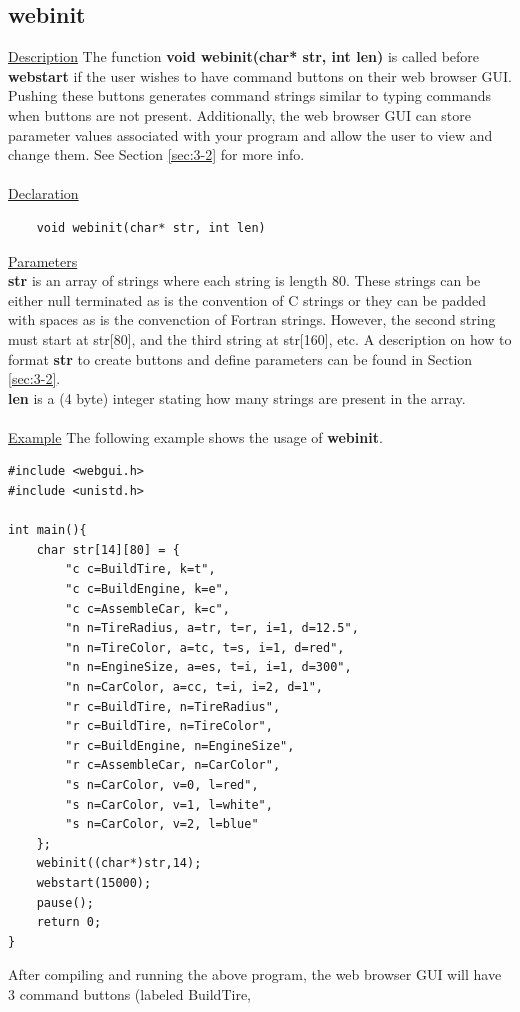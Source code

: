 \subsection{webinit}
\label{sec:2-1}
\underline{Description} The function \textbf{void webinit(char* str, int len)} is called before \textbf{webstart}
if the user wishes to have command buttons on their web browser GUI. Pushing these buttons generates command strings
similar to typing commands when buttons are not present. Additionally, the web browser GUI can store parameter
values associated with your program and allow the user to view and change them. See Section \ref{sec:3-2} for more info.\\
\\
\underline{Declaration}
\begin{verbatim} 
	void webinit(char* str, int len)
\end{verbatim}
\underline{Parameters}\\
\textbf{str} is an array of strings where each string is length 80. These strings can be
either null terminated as is the convention of C strings or they can be padded with spaces as is the convenction
of Fortran strings. However, the second string must start at str[80], and the third string at str[160], etc. A
description on how to format \textbf{str} to create buttons and define parameters can be found in Section \ref{sec:3-2}.\\
\textbf{len} is a (4 byte) integer stating how many strings are present in the array.\\
\\
\underline{Example} The following example shows the usage of \textbf{webinit}.
\begin{verbatim}
#include <webgui.h>
#include <unistd.h>

int main(){
    char str[14][80] = {
        "c c=BuildTire, k=t",
        "c c=BuildEngine, k=e",
        "c c=AssembleCar, k=c",
        "n n=TireRadius, a=tr, t=r, i=1, d=12.5",
        "n n=TireColor, a=tc, t=s, i=1, d=red",
        "n n=EngineSize, a=es, t=i, i=1, d=300",
        "n n=CarColor, a=cc, t=i, i=2, d=1",
        "r c=BuildTire, n=TireRadius",
        "r c=BuildTire, n=TireColor",
        "r c=BuildEngine, n=EngineSize",
        "r c=AssembleCar, n=CarColor",
        "s n=CarColor, v=0, l=red",
        "s n=CarColor, v=1, l=white",
        "s n=CarColor, v=2, l=blue"
    };
    webinit((char*)str,14);
    webstart(15000);
    pause();
    return 0;
}
\end{verbatim}
After compiling and running the above program, the web browser GUI will have 3 command buttons (labeled BuildTire,
